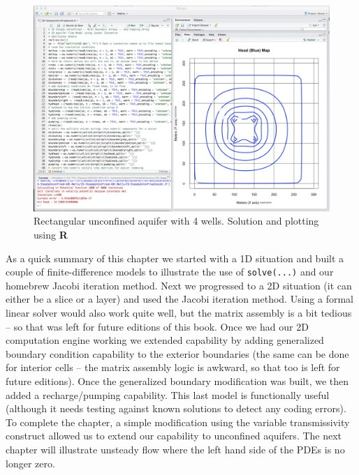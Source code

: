 \begin{figure}[h!] %
   \centering
   \includegraphics[width=6in]{./17-SteadyGroundwaterFlow/4WellsSteadyUnconfinedInR.jpg} 
   \caption{Rectangular unconfined aquifer with 4 wells.  Solution and plotting using \textbf{R}}
   \label{fig:4WellsSteadyUnconfinedInR}
\end{figure}


As a quick summary of this chapter we started with a 1D situation and built a couple of finite-difference models to illustrate the use of \texttt{solve(...)} and our homebrew Jacobi iteration method.  Next we progressed to a 2D situation (it can either be a slice or a layer) and used the Jacobi iteration method.  Using a formal linear solver would also work quite well, but the matrix assembly is a bit tedious -- so that was left for future editions of this book.   Once we had our 2D computation engine working we extended capability by adding generalized boundary condition capability to the exterior boundaries (the same can be done for interior cells -- the matrix assembly logic is awkward, so that too is left for future editions).   Once the generalized boundary modification was built, we then added a recharge/pumping capability.  This last model is functionally useful (although it needs testing against known solutions to detect any coding errors).   To complete the chapter, a simple modification using the variable transmissivity construct allowed us to extend our capability to unconfined aquifers.  The next chapter will illustrate unsteady flow where the left hand side of the PDEs is no longer zero.
\clearpage

